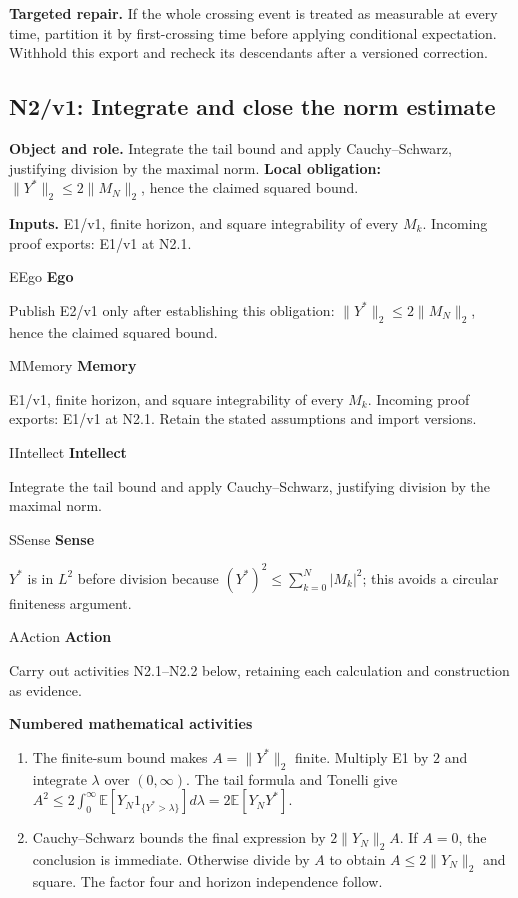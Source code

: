 \documentclass[preprint,12pt,aps,pra,showkeys,amsmath,amssymb,superscriptaddress,floatfix]{revtex4-2}
\theoremstyle{definition}
\theoremstyle{remark}
\newcommand{\mmfaculty}[3]{%
 \begin{mmfacultybox}{#1}{#2}
 {\sffamily\bfseries\color{MMBlue}#2}\par\smallskip #3
 \end{mmfacultybox}}
\newcommand{\field}[2]{\par\smallskip\noindent\textbf{#1.} #2\par}
\begin{document}
\field{Targeted repair}{If the whole crossing event is treated as measurable at every time,
partition it by first-crossing time before applying conditional
expectation. Withhold this export and recheck its descendants after a
versioned correction.}

\clearpage

\subsection{N2/v1: Integrate and close the norm estimate}

\field{Object and role}{Integrate the tail bound and apply Cauchy--Schwarz, justifying division
by the maximal norm. \textbf{Local obligation:}
\(\|Y^*\|_2\le2\|M_N\|_2\), hence the claimed squared bound.}

\field{Inputs}{E1/v1, finite horizon, and square integrability of every \(M_k\).
Incoming proof exports: E1/v1 at N2.1.}

\mmfaculty{E}{Ego}{Publish E2/v1 only after establishing this obligation:
\(\|Y^*\|_2\le2\|M_N\|_2\), hence the claimed squared bound.}

\mmfaculty{M}{Memory}{E1/v1, finite horizon, and square integrability of every \(M_k\).
Incoming proof exports: E1/v1 at N2.1. Retain the stated assumptions and
import versions.}

\mmfaculty{I}{Intellect}{Integrate the tail bound and apply Cauchy--Schwarz, justifying division
by the maximal norm.}

\mmfaculty{S}{Sense}{\(Y^*\) is in \(L^2\) before division because
\((Y^*)^2\le\sum_{k=0}^N|M_k|^2\); this avoids a circular finiteness
argument.}

\mmfaculty{A}{Action}{Carry out activities N2.1--N2.2 below, retaining each calculation and
construction as evidence.}

\smallskip\noindent\textbf{Numbered mathematical activities}

\begin{enumerate}[label=N2.\arabic*,leftmargin=3.4em]

\item The finite-sum bound makes \(A=\|Y^*\|_2\) finite. Multiply E1 by \(2\)
and integrate \(\lambda\) over \((0,\infty)\). The tail formula and
Tonelli give
\(A^2\le2\int_0^\infty\mathbb E[Y_N1_{\{Y^*>\lambda\}}]d\lambda=2\mathbb E[Y_NY^*]\).

\item Cauchy--Schwarz bounds the final expression by \(2\|Y_N\|_2 A\). If
\(A=0\), the conclusion is immediate. Otherwise divide by \(A\) to
obtain \(A\le2\|Y_N\|_2\) and square. The factor four and horizon
independence follow.

\end{enumerate}
\end{document}
